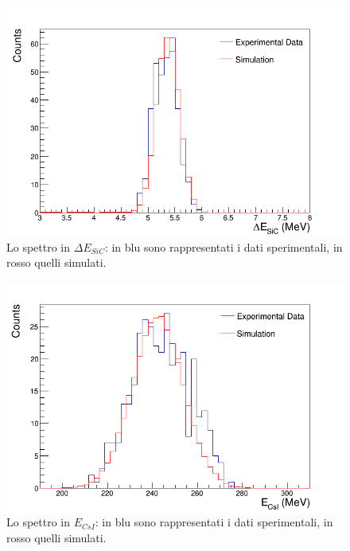 

\begin{figure} [!p]
	\centering
	\includegraphics[width=\textwidth, keepaspectratio]{Grafici_Tesi/Test/spettro_sic.png}
	\caption{Lo spettro in $\Delta E_{SiC}$: in blu sono rappresentati i dati sperimentali, in rosso quelli simulati.} \label{fig:spettro_sic}
\end{figure}



\begin{figure} [!p]
	\centering
	\includegraphics[width=\textwidth, keepaspectratio]{Grafici_Tesi/Test/spettro_csi.png}
	\caption{Lo spettro in $E_{CsI}$: in blu sono rappresentati i dati sperimentali, in rosso quelli simulati.} \label{fig:spettro_csi_simul}
\end{figure}


